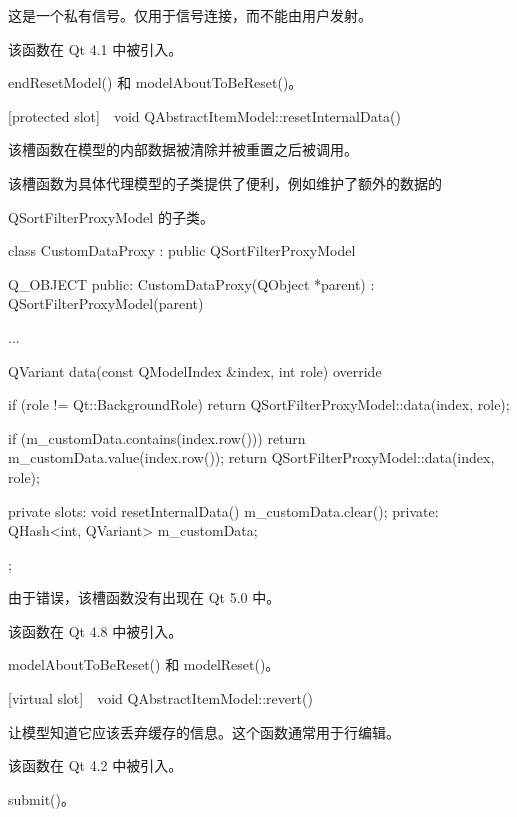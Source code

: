 \begin{notice}
这是一个私有信号。仅用于信号连接，而不能由用户发射。
\end{notice}

该函数在 Qt 4.1 中被引入。

\begin{seeAlso}
endResetModel() 和 modelAboutToBeReset()。
\end{seeAlso}

[protected slot] void QAbstractItemModel::resetInternalData()

该槽函数在模型的内部数据被清除并被重置之后被调用。

该槽函数为具体代理模型的子类提供了便利，例如维护了额外的数据的

QSortFilterProxyModel 的子类。

\begin{cppcode}
 class CustomDataProxy : public QSortFilterProxyModel
 {
     Q_OBJECT
 public:
     CustomDataProxy(QObject *parent)
       : QSortFilterProxyModel(parent)
     {
     }

     ...

     QVariant data(const QModelIndex &index, int role) override
     {
         if (role != Qt::BackgroundRole)
             return QSortFilterProxyModel::data(index, role);

         if (m_customData.contains(index.row()))
             return m_customData.value(index.row());
         return QSortFilterProxyModel::data(index, role);
     }
 private slots:
     void resetInternalData()
     {
         m_customData.clear();
     }
 private:
   QHash<int, QVariant> m_customData;
 };
\end{cppcode}

\begin{notice}
由于错误，该槽函数没有出现在 Qt 5.0 中。
\end{notice}

该函数在 Qt 4.8 中被引入。

\begin{seeAlso}
modelAboutToBeReset() 和 modelReset()。
\end{seeAlso}

[virtual slot] void QAbstractItemModel::revert()

让模型知道它应该丢弃缓存的信息。这个函数通常用于行编辑。

该函数在 Qt 4.2 中被引入。

\begin{seeAlso}
submit()。
\end{seeAlso}

